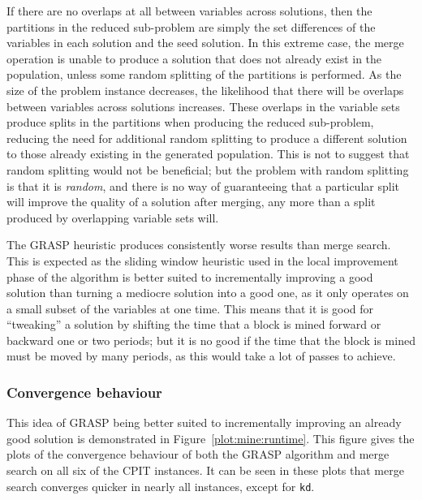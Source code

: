 \documentclass[authoryear,11pt,square,number,times,super,comma]{elsarticle}
\newcommand{\dmine}{\texttt{kd}}
\begin{document}
If there are no overlaps at all between variables across solutions, then the partitions in the reduced sub-problem are simply the set differences of the variables in each solution and the seed solution. In this extreme case, the merge operation is unable to produce a solution that does not already exist in the population, unless some random splitting of the partitions is performed. As the size of the problem instance decreases, the likelihood that there will be overlaps between variables across solutions increases. These overlaps in the variable sets produce splits in the partitions when producing the reduced sub-problem, reducing the need for additional random splitting to produce a different solution to those already existing in the generated population. This is not to suggest that random splitting would not be beneficial; but the problem with random splitting is that it is \emph{random}, and there is no way of guaranteeing that a particular split will improve the quality of a solution after merging, any more than a split produced by overlapping variable sets will.

The GRASP heuristic produces consistently worse results than merge search. This is expected as the sliding window heuristic used in the local improvement phase of the algorithm is better suited to incrementally improving a good solution than turning a mediocre solution into a good one, as it only operates on a small subset of the variables at one time. This means that it is good for ``tweaking'' a solution by shifting the time that a block is mined forward or backward one or two periods; but it is no good if the time that the block is mined must be moved by many periods, as this would take a lot of passes to achieve.

\subsubsection*{Convergence behaviour}

This idea of GRASP being better suited to incrementally improving an already good solution is demonstrated in Figure~\ref{plot:mine:runtime}. This figure gives the plots of the convergence behaviour of both the GRASP algorithm and merge search on all six of the CPIT instances. It can be seen in these plots that merge search converges quicker in nearly all instances, except for \dmine{}. 
\end{document}
